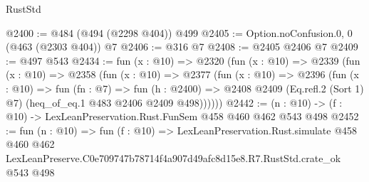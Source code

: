 \begin{lexlean}{RustStd}
\begin{coremodule}
@2400 := @484 (@494 (@2298 @404)) @499
@2405 := Option.noConfusion.{0, 0} (@463 (@2303 @404)) @7
@2406 := @316 @7
@2408 := @2405 @2406 @7
@2409 := @497 @543
@2434 := fun (x : @10) =>
  @2320
    (fun (x : @10) =>
    @2339
      (fun (x : @10) =>
      @2358
        (fun (x : @10) =>
        @2377
          (fun (x : @10) =>
          @2396
            (fun (x : @10) =>
            fun (fn : @7) =>
            fun (h : @2400) =>
            @2408 @2409 (Eq.refl.{2} (Sort 1) @7) (heq_of_eq.{1} @483 @2406 @2409 @498))))))
@2442 := (n : @10) -> (f : @10) -> LexLeanPreservation.Rust.FunSem @458 @460 @462 @543 @498
@2452 := fun (n : @10) =>
  fun (f : @10) =>
  LexLeanPreservation.Rust.simulate
    @458
    @460
    @462
    LexLeanPreserve.C0e709747b78714f4a907d49afc8d15e8.R7.RustStd.crate_ok
    @543
    @498
\end{coremodule}
\end{lexlean}

